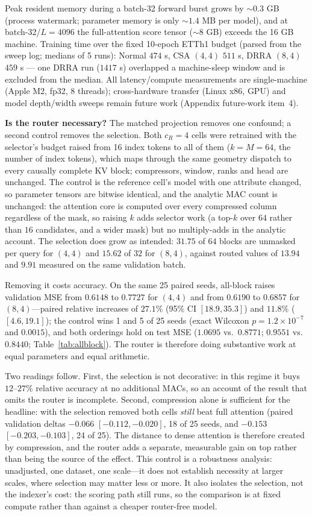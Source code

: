 Peak resident memory during a batch-32 forward burst grows by
${\sim}0.3$ GB (process watermark; parameter memory is only ${\sim}1.4$ MB
per model), and at batch-32/$L{=}4096$ the full-attention score tensor
(${\sim}8$ GB) exceeds the 16 GB machine. Training time over the fixed
10-epoch ETTh1 budget (parsed from the sweep log; medians of 5 runs):
Normal $474$ s, CSA $(4,4)$ $511$ s, DRRA $(8,4)$ $459$ s --- one DRRA run
($1417$ s) overlapped a machine-sleep window and is excluded from the
median. All latency/compute measurements are single-machine (Apple M2,
fp32, 8 threads); cross-hardware transfer (Linux x86, GPU) and model
depth/width sweeps remain future work (Appendix future-work item~4).

\textbf{Is the router necessary?} The matched projection removes one confound;
a second control removes the selection. Both $c_R{=}4$ cells were retrained
with the selector's budget raised from 16 index tokens to all of them
($k{=}M{=}64$, the number of index tokens), which maps through the same
geometry dispatch to every causally complete KV block; compressors, window,
ranks and head are unchanged. The control
is the reference cell's model with one attribute changed, so parameter tensors
are bitwise identical, and the analytic MAC count is unchanged: the attention
core is computed over every compressed column regardless of the mask, so raising
$k$ adds selector work (a top-$k$ over $64$ rather than $16$ candidates, and a
wider mask) but no multiply-adds in the analytic account.
The selection does grow as intended: $31.75$ of $64$ blocks are unmasked per
query for $(4,4)$ and $15.62$ of $32$ for $(8,4)$, against routed values of
$13.94$ and $9.91$ measured on the same validation batch.

Removing it costs accuracy. On the same 25 paired seeds, all-block raises
validation MSE from $0.6148$ to $0.7727$ for $(4,4)$ and from $0.6190$ to
$0.6857$ for $(8,4)$---paired relative increases of $27.1\%$ (95\% CI
$[18.9,35.3]$) and $11.8\%$ ($[4.6,19.1]$); the control wins 1 and 5 of 25
seeds (exact Wilcoxon $p=1.2\times10^{-7}$ and $0.0015$), and both orderings
hold on test MSE ($1.0695$ vs.\ $0.8771$; $0.9551$ vs.\ $0.8440$;
Table~\ref{tab:allblock}). The router is therefore doing substantive work at
equal parameters and equal arithmetic.

Two readings follow. First, the selection is not decorative: in this regime it
buys $12$--$27\%$ relative accuracy at no additional MACs, so an account of the
result that omits the router is incomplete. Second, compression alone is
sufficient for the headline: with the selection removed both cells \emph{still}
beat full attention (paired validation deltas $-0.066$ $[-0.112,-0.020]$, 18 of
25 seeds, and $-0.153$ $[-0.203,-0.103]$, 24 of 25). The distance to dense
attention is therefore created by compression, and the router adds a separate,
measurable gain on top rather than being the source of the effect. This control
is a robustness analysis: unadjusted, one dataset, one scale---it does not
establish necessity at larger scales, where selection may matter less or more.
It also isolates the selection, not the indexer's cost: the scoring path still
runs, so the comparison is at fixed compute rather than against a cheaper
router-free model.

